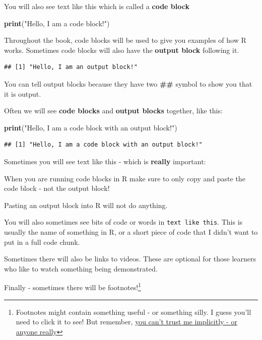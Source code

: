 \documentclass[
]{book}
\newenvironment{Shaded}{\begin{snugshade}}{\end{snugshade}}
\newcommand{\KeywordTok}[1]{\textcolor[rgb]{0.13,0.29,0.53}{\textbf{#1}}}
\newcommand{\NormalTok}[1]{#1}
\newcommand{\StringTok}[1]{\textcolor[rgb]{0.31,0.60,0.02}{#1}}
\begin{document}
You will also see text like this which is called a \textbf{code block}

\begin{Shaded}
\begin{Highlighting}[]
\KeywordTok{print}\NormalTok{(}\StringTok{"Hello, I am a code block!"}\NormalTok{)}
\end{Highlighting}
\end{Shaded}

Throughout the book, code blocks will be used to give you examples of how R works. Sometimes code blocks will also have the \textbf{output block} following it.

\begin{verbatim}
## [1] "Hello, I am an output block!"
\end{verbatim}

You can tell output blocks because they have two \textbf{\#\#} symbol to show you that it is output.

Often we will see \textbf{code blocks} and \textbf{output blocks} together, like this:

\begin{Shaded}
\begin{Highlighting}[]
\KeywordTok{print}\NormalTok{(}\StringTok{"Hello, I am a code block with an output block!"}\NormalTok{)}
\end{Highlighting}
\end{Shaded}

\begin{verbatim}
## [1] "Hello, I am a code block with an output block!"
\end{verbatim}

Sometimes you will see text like this - which is \textbf{really} important:

When you are running code blocks in R make sure to only copy and paste the code block - not the output block!

Pasting an output block into R will not do anything.

You will also sometimes see bits of code or words in \texttt{text\ like\ this}. This is usually the name of something in R, or a short piece of code that I didn't want to put in a full code chunk.

Sometimes there will also be links to videos. These are optional for those learners who like to watch something being demonstrated.

Finally - sometimes there will be footnotes!\footnote{Footnotes might contain something useful - or something silly. I guess you'll need to click it to see! But remember, \href{https://youtu.be/UaGTFeibOEk}{you can't trust me implicitly - or anyone really}}
\end{document}
